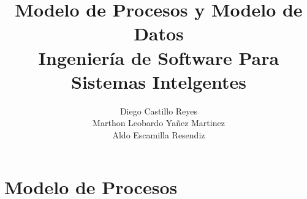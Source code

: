 \documentclass{report}
\title{\Huge{\textbf{Modelo de Procesos y Modelo de Datos}}\\
\Large{\textbf{Ingeniería de Software Para Sistemas Intelgentes}}}
\author{Diego Castillo Reyes\\Marthon Leobardo Yañez Martinez\\Aldo Escamilla Resendiz}
\begin{document}
\maketitle
\section{Modelo de Procesos}
\end{document}

